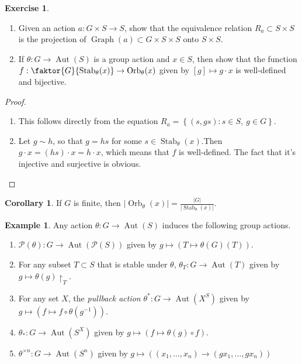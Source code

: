 \documentclass[10pt,letterpaper,cm]{nupset}
\theoremstyle{definition}
\newtheorem{exmp}[definition]{Example}
\theoremstyle{theorem}
\newtheorem{corollary}[definition]{Corollary}
\newtheorem{exercise}[definition]{Exercise}
\theoremstyle{remark}
\newcommand{\1}{\mathbf{1}}
\newcommand{\0}{\vec 0}
\DeclareMathOperator{\graph}{Graph}
\DeclareMathOperator{\aut}{Aut}
\DeclareMathOperator{\stab}{Stab}
\DeclareMathOperator{\orb}{Orb}
\begin{document}
\begin{exercise} $ $
\begin{enumerate}
\item Given an action $a: G \times S \to S$, show that the equivalence relation $R_a \subset S \times S$ is the projection of $\graph(a) \subset G\times S \times S$ onto $S \times S$.
\item If $\theta : G \to \aut(S)$ is a group action and $x\in S$, then show that the function \linebreak$f : \faktor{G}{\stab_{\theta}(x)} \to \orb_{\theta}(x)$ given by $\left[g\right] \mapsto g \cdot x$ is well-defined and bijective.
\end{enumerate}
\end{exercise}
\begin{proof} $ $
\begin{enumerate}
\item This follows directly from the equation $R_a = \left\{\left(s, gs\right): s \in S, \ g\in G\right\}$.
\item Let $g \sim h$, so that $g = hs$ for some $s\in \stab_{\theta}(x)$.Then $g \cdot x = \left(hs\right)\cdot x = h\cdot x$, which means that $f$ is well-defined. The fact that it's injective and surjective is obvious. 
\end{enumerate}
\end{proof}

\begin{corollary}
If $G$ is finite, then $\left\lvert{\orb_{\theta}(x)}\right\rvert = \frac{ \left\lvert{G}\right\rvert}{\left\lvert{\stab_{\theta}(x)}\right\rvert}$.
\end{corollary}

\medskip

\begin{exmp}
Any action $\theta : G \to \aut(S)$ induces the following group actions.
\begin{enumerate}
\item $\mathcal{P}(\theta) : G \to \aut(\mathcal{P}(S))$ given by $g \mapsto \left(T \mapsto \theta(G)(T)\right)$.
\item For any subset $T \subset S$ that is stable under $\theta$, $\theta_T : G \to \aut(T)$ given by $g \mapsto \theta(g)\restriction_T$.
\item For any set $X$, the \textit{pullback action} $\theta^\ast : G \to \aut(X^S)$ given by $g \mapsto \left(f \mapsto f \circ \theta(g^{-1})\right)$.
\item $\theta_{\ast}: G \to \aut(S^X)$ given by $g\mapsto \left(f \mapsto \theta(g) \circ f\right)$.
\item $\theta^{\times n} : G \to \aut(S^n)$ given by $g \mapsto \left((x_1, \ldots, x_n) \to (gx_1, \ldots, gx_n)\right)$
\end{enumerate}
\end{exmp}
\end{document}
